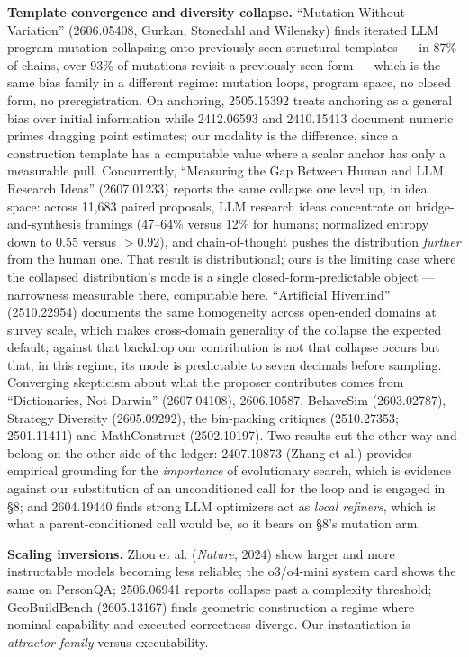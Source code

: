 \documentclass[11pt]{article}
\begin{document}
\textbf{Template convergence and diversity collapse.} ``Mutation Without Variation'' (2606.05408,
Gurkan, Stonedahl and Wilensky) finds iterated LLM program mutation collapsing onto previously
seen structural templates --- in 87\% of chains, over 93\% of mutations revisit a previously seen
form --- which is the same bias family in a different regime: mutation loops, program space, no
closed form, no preregistration. On anchoring, 2505.15392 treats anchoring as a general bias
over initial information while 2412.06593 and 2410.15413 document numeric primes dragging point
estimates; our modality is the difference, since a construction template has a computable value
where a scalar anchor has only a measurable pull. Concurrently, ``Measuring the Gap Between
Human and LLM Research Ideas'' (2607.01233) reports the same collapse one level up, in idea
space: across 11{,}683 paired proposals, LLM research ideas concentrate on bridge-and-synthesis
framings (47--64\% versus 12\% for humans; normalized entropy down to 0.55 versus $>$0.92), and
chain-of-thought pushes the distribution \textit{further} from the human one. That result is
distributional; ours is the limiting case where the collapsed distribution's mode is a single
closed-form-predictable object --- narrowness measurable there, computable here. ``Artificial
Hivemind'' (2510.22954) documents the same homogeneity across open-ended domains at survey
scale, which makes cross-domain generality of the collapse the expected default; against that
backdrop our contribution is not that collapse occurs but that, in this regime, its mode is
predictable to seven decimals before sampling. Converging skepticism about what the proposer
contributes comes from ``Dictionaries, Not Darwin'' (2607.04108), 2606.10587, BehaveSim
(2603.02787), Strategy Diversity (2605.09292), the bin-packing critiques (2510.27353;
2501.11411) and MathConstruct (2502.10197). Two results cut the other way and belong on the
other side of the ledger: 2407.10873 (Zhang et al.) provides empirical grounding for the
\textit{importance} of evolutionary search, which is evidence against our substitution of an
unconditioned call for the loop and is engaged in \S8; and 2604.19440 finds strong LLM optimizers
act as \textit{local refiners}, which is what a parent-conditioned call would be, so it bears on \S8's
mutation arm.

\textbf{Scaling inversions.} Zhou et al. (\textit{Nature}, 2024) show larger and more instructable models
becoming less reliable; the o3/o4-mini system card shows the same on PersonQA; 2506.06941
reports collapse past a complexity threshold; GeoBuildBench (2605.13167) finds geometric
construction a regime where nominal capability and executed correctness diverge. Our
instantiation is \textit{attractor family} versus executability.
\end{document}
